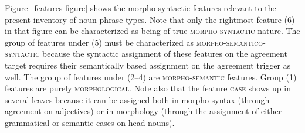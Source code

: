 Figure~\ref{features figure} shows the morpho-syntactic features relevant to the present inventory of noun phrase types. Note that only the rightmost feature (6) in that figure can be characterized as being of true \textsc{morpho-syntactic} nature. The group of features under (5) must be characterized as \textsc{morpho-semantico-syntactic} because the syntactic assignment of these features on the agreement target requires their semantically based assignment on the agreement trigger as well. The group of features under (2–4) are \textsc{morpho-semantic} features. Group (1) features are purely \textsc{morphological}. Note also that the feature \textsc{case} shows up in several leaves because  it can be assigned both in morpho-syntax (through agreement on adjectives) or in morphology (through the assignment of either grammatical or semantic cases on head nouns). 

